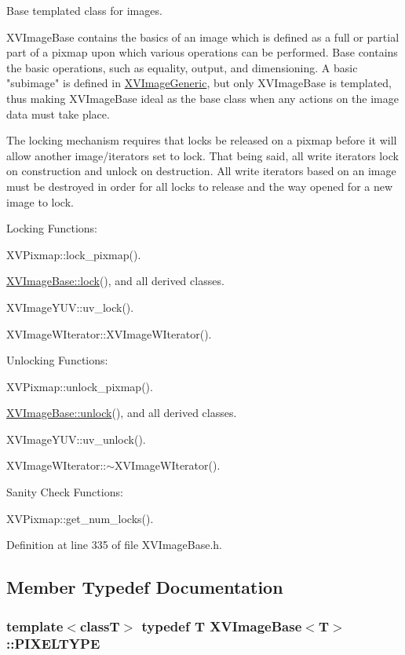 Base templated class for images.

XVImage\-Base contains the basics of an image which is defined as a full  or partial part of a pixmap upon which various operations can be performed. Base contains the basic operations, such as equality, output,  and dimensioning.  A basic "subimage" is defined in \hyperlink{class_XVImageGeneric}{XVImage\-Generic}, but only XVImage\-Base is templated, thus making XVImage\-Base ideal as the base class when any actions on the image data must take place. \par
The locking mechanism requires that locks be released on a pixmap before it will allow another image/iterators set to lock. That being said, all write iterators lock on construction and unlock on destruction. All write iterators based on an image must be destroyed in order for all locks to release and the way opened for a new image to lock.\par
 Locking Functions:\par
 XVPixmap::lock\_\-pixmap().\par
 \hyperlink{class_XVImageBase_a6}{XVImage\-Base::lock}(), and all derived classes.\par
 XVImage\-YUV::uv\_\-lock().\par
 XVImage\-WIterator::XVImage\-WIterator().\par
 Unlocking Functions:\par
 XVPixmap::unlock\_\-pixmap().\par
 \hyperlink{class_XVImageBase_a7}{XVImage\-Base::unlock}(), and all derived classes.\par
 XVImage\-YUV::uv\_\-unlock().\par
 XVImage\-WIterator::$\sim$XVImage\-WIterator().\par
 Sanity Check Functions:\par
 XVPixmap::get\_\-num\_\-locks().\par
 



Definition at line 335 of file XVImage\-Base.h.

\subsection{Member Typedef Documentation}
\label{XVImageBase_s0}
\hypertarget{class_XVImageBase_s0}{
\subsubsection[PIXELTYPE]{\setlength{\rightskip}{0pt plus 5cm}template$<$classT$>$ typedef T XVImage\-Base$<$T$>$::PIXELTYPE}}




